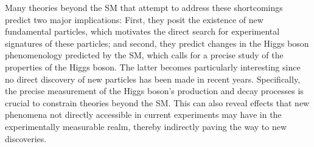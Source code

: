 Many theories beyond the SM that attempt to address these shortcomings predict two major implications: First, they posit the existence of new fundamental particles, which motivates the direct search for experimental signatures of these particles; and second, they predict changes in the Higgs boson phenomenology predicted by the SM, which calls for a precise study of the properties of the Higgs boson. 
The latter becomes particularly interesting since no direct discovery of new particles has been made in recent years. 
Specifically, the precise measurement of the Higgs boson's production and decay processes is crucial to constrain theories beyond the SM. 
This can also reveal effects that new phenomena not directly accessible in current experiments may have in the experimentally measurable realm, thereby indirectly paving the way to new discoveries. 


